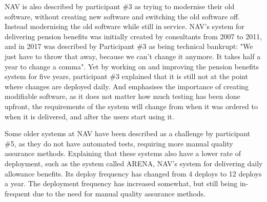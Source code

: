 
NAV is also described by participant \#3 as trying to modernise their old software, without creating new software and switching the old software off. Instead modernising the old software while still in service. NAV's system for delivering pension benefits was initially created by consultants from 2007 to 2011, and in 2017 was described by Participant \#3 as being technical bankrupt: "We just have to throw that away, because we can't change it anymore. It takes half a year to change a comma". Yet by working on and improving the pension benefits system for five years, participant \#3 explained that it is still not at the point where changes are deployed daily. And emphasises the importance of creating modifiable software, as it does not matter how much testing has been done upfront, the requirements of the system will change from when it was ordered to when it is delivered, and after the users start using it.


Some older systems at NAV have been described as a challenge by participant \#5, as they do not have automated tests, requiring more manual quality assurance methods. Explaining that these systems also have a lower rate of deployment, such as the system called ARENA, NAV's system for delivering daily allowance benefits. Its deploy frequency has changed from 4 deploys to 12 deploys a year. The deployment frequency has increased somewhat, but still being in-frequent due to the need for manual quality assurance methods.


